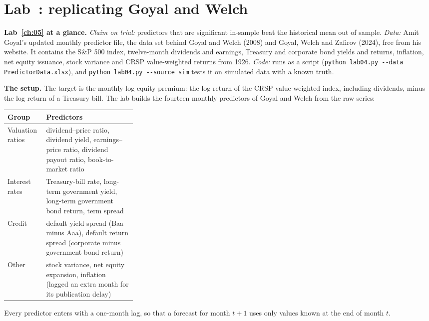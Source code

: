 \section{Lab~\thechapter: replicating Goyal and Welch}
\label{sec:05-lab}

\begin{callout}
\textbf{Lab~\ref{ch:05} at a glance.} \emph{Claim on trial:} predictors that are significant in-sample beat the historical mean out of sample. \emph{Data:} Amit Goyal's updated monthly predictor file, the data set behind Goyal and Welch (2008) and Goyal, Welch and Zafirov (2024), free from his website. It contains the S\&P 500 index, twelve-month dividends and earnings, Treasury and corporate bond yields and returns, inflation, net equity issuance, stock variance and CRSP value-weighted returns from 1926. \emph{Code:} runs as a script (\texttt{python lab04.py -{}-data PredictorData.xlsx}), and \texttt{python lab04.py -{}-source sim} tests it on simulated data with a known truth.
\end{callout}

\textbf{The setup.} The target is the monthly log equity premium: the log return of the CRSP value-weighted index, including dividends, minus the log return of a Treasury bill. The lab builds the fourteen monthly predictors of Goyal and Welch from the raw series:

\begin{center}
\small
\begin{tabularx}{0.9\linewidth}{@{}>{\raggedright\arraybackslash}p{0.30\linewidth}>{\raggedright\arraybackslash}X@{}}
\toprule
Group & Predictors \\
\midrule
Valuation ratios & dividend--price ratio, dividend yield, earnings--price ratio, dividend payout ratio, book-to-market ratio \\
Interest rates & Treasury-bill rate, long-term government yield, long-term government bond return, term spread \\
Credit & default yield spread (Baa minus Aaa), default return spread (corporate minus government bond return) \\
Other & stock variance, net equity expansion, inflation (lagged an extra month for its publication delay) \\
\bottomrule
\end{tabularx}
\end{center}

Every predictor enters with a one-month lag, so that a forecast for month $t+1$ uses only values known at the end of month $t$.

